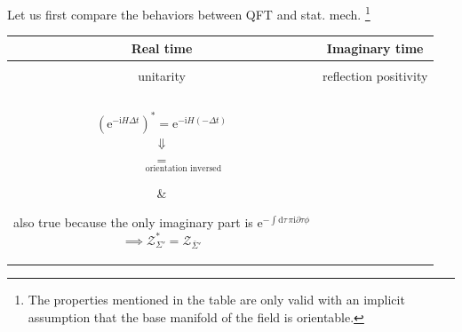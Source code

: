 Let us first compare the behaviors between QFT and stat. mech.
\footnote{
    The properties mentioned in the table are only valid with an implicit assumption that the base manifold of the field is orientable.
}
\begin{center}
    \begin{tabular}{|c|c|}
        \hline
        Real time & Imaginary time\\ 
        \hline & \\
        unitarity & reflection positivity\\ & \\
        \hline & \\
        \parbox{5cm}{\centering
            $\left( \mathrm{e}^{- \mathrm{i} H \Delta t} \right)^{*} = \mathrm{e}^{ - \mathrm{i} H (- \Delta t) }$
            \\
            $\Downarrow$
            \\
            $\mathop{\mathcal{Z}_{\mathbb{R} \times \Sigma}^{*} = \mathcal{Z}_{\mathop{\bar{\mathbb{R}}}\limits^{}_{\uparrow} \times \Sigma}}\limits^{}_{
                \hspace{5em} \text{orientation inversed}
                }
            $
            }&
        
        \parbox{5cm}{\centering
            also true because the only imaginary part is $\mathrm{e}^{- \int \mathrm{d} \tau \, \pi \mathrm{i}  \partial\tau \phi}$
            \\
            $\implies \mathcal{Z}^{*}_{\Sigma'} = \mathcal{Z}_{\bar{\Sigma}'}$
        } \\ & 

        \\ \hline

        \\

        \\
        \\
        \hline & \\


\end{tabular}
\end{center}
